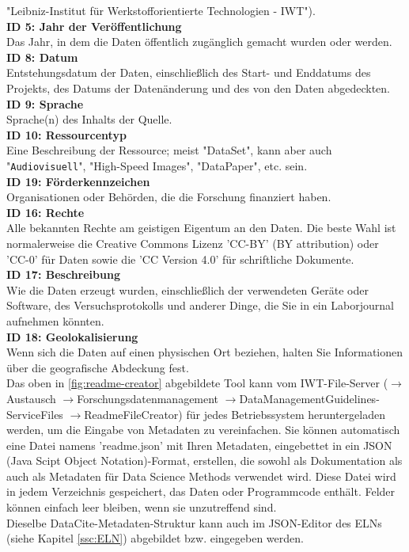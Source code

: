 "Leibniz-Institut für Werkstofforientierte Technologien - IWT"). \\[6pt]
%
\textbf{ID 5: Jahr der Veröffentlichung} \\
Das Jahr, in dem die Daten öffentlich zugänglich gemacht wurden oder werden. \\[6pt]
%
\textbf{ID 8: Datum} \\
Entstehungsdatum der Daten, einschließlich des Start- und Enddatums des
Projekts, des Datums der Datenänderung und des von den Daten abgedeckten. \\[6pt]
%
\textbf{ID 9: Sprache} \\
Sprache(n) des Inhalts der Quelle. \\[6pt]
%
\textbf{ID 10: Ressourcentyp} \\
Eine Beschreibung der Ressource; meist "DataSet", kann aber auch "\verb+Audiovisuell+",
"High-Speed Images", "DataPaper", etc. sein.\\[6pt]
%
\textbf{ID 19: Förderkennzeichen} \\
Organisationen oder Behörden, die die Forschung finanziert haben. \\[6pt]
%
\textbf{ID 16: Rechte} \\
Alle bekannten Rechte am geistigen Eigentum an den Daten. Die beste Wahl ist
normalerweise die Creative Commons Lizenz 'CC-BY' (BY attribution) oder 'CC-0'
für Daten sowie die 'CC Version 4.0' für schriftliche Dokumente. \\[6pt]
%
\textbf{ID 17: Beschreibung} \\
Wie die Daten erzeugt wurden, einschließlich der verwendeten Geräte oder
Software, des Versuchs\-protokolls und anderer Dinge, die Sie in ein Laborjournal
aufnehmen könnten. \\[6pt]
%
\textbf{ID 18: Geolokalisierung} \\
Wenn sich die Daten auf einen physischen Ort beziehen, halten Sie Informationen
über die geografische Abdeckung fest. \\[6pt]
%
Das oben in \autoref{fig:readme-creator} abgebildete Tool kann vom IWT-File-Server ($\rightarrow$Austausch $\rightarrow$Forschungs\-datenmanagement $\rightarrow$DataManagementGuidelines-ServiceFiles $\rightarrow$ReadmeFileCreator) für jedes Betriebssystem  heruntergeladen werden, um die Eingabe von Metadaten zu vereinfachen. Sie  können automatisch eine Datei namens 'readme.json' mit Ihren Metadaten, eingebettet in ein JSON (Java Scipt Object Notation)-Format, erstellen, die sowohl als Dokumentation als auch als Metadaten für Data Science Methods verwendet wird. Diese Datei wird in jedem Verzeichnis gespeichert, das Daten oder Programmcode enthält. Felder können einfach leer bleiben, wenn sie unzutreffend sind.\\
%
Dieselbe DataCite-Metadaten-Struktur kann auch im JSON-Editor des ELNs (siehe Kapitel \ref{ssc:ELN}) abgebildet bzw. eingegeben werden.


